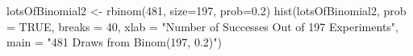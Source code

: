 \begin{Schunk}
\begin{Sinput}
  lotsOfBinomial2 <- rbinom(481, size=197, prob=0.2)
  hist(lotsOfBinomial2, prob = TRUE, breaks = 40, xlab = "Number of Successes Out of 197 Experiments", main = "481 Draws from Binom(197, 0.2)")
\end{Sinput}
\end{Schunk}
